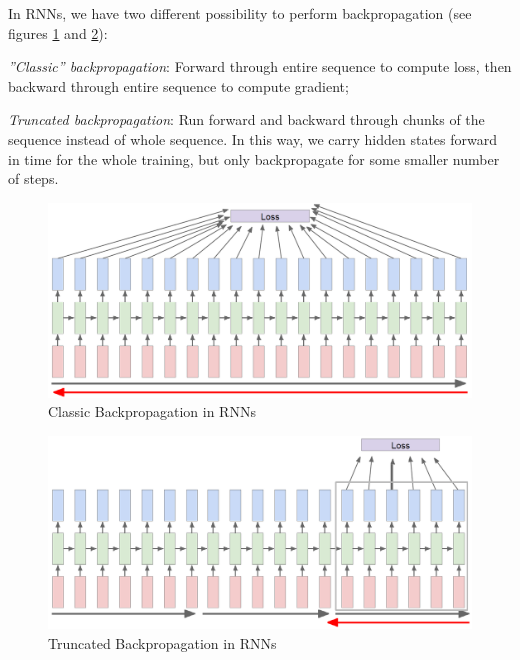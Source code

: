 In RNNs, we have two different possibility to perform backpropagation (see figures \ref{fig:seq-rnn-backpropagation} and \ref{fig:seq-rnn-backpropagation1}):
\begin{myenum}
    \item \textit{''Classic'' backpropagation}: Forward through entire sequence to compute loss, then backward through entire sequence to compute gradient;
    \item \textit{Truncated backpropagation}: Run forward and backward through chunks of the sequence instead of whole sequence. In this way, we carry hidden states forward in time for the whole training, but only backpropagate for some smaller number of steps.
\end{myenum}


\begin{minipage}{.5\linewidth}
    \begin{figure}[H]
        \centering
        \includegraphics[width=0.8\linewidth]{images/seq-rnn-backpropagation}
        \caption[Classic Backpropagation in RNNs]{Classic Backpropagation in RNNs}
        \label{fig:seq-rnn-backpropagation}
    \end{figure}
\end{minipage}
\begin{minipage}{.5\linewidth}
    \begin{figure}[H]
        \centering
        \includegraphics[width=0.8\linewidth]{images/seq-rnn-backpropagation1}
        \caption[Truncated Backpropagation in RNNs]{Truncated Backpropagation in RNNs}
        \label{fig:seq-rnn-backpropagation1}
    \end{figure}
\end{minipage}

